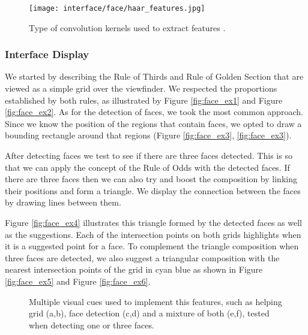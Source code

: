 \begin{figure}[htb]
	\centering
	\texttt{[image: interface/face/haar\_features.jpg]}
  	\caption{Type of convolution kernels used to extract features \cite{OCV}.}
	\label{fig:haar_features}
\end{figure}

\subsubsection{Interface Display}

We started by describing the Rule of Thirds and Rule of Golden Section that are viewed as a simple grid over the viewfinder. We respected the proportions established by both rules, as illustrated by Figure \ref{fig:face_ex1} and Figure \ref{fig:face_ex2}.
As for the detection of faces, we took the most common approach. Since we know the position of the regions that contain faces, we opted to draw a bounding rectangle around that regions (Figure \ref{fig:face_ex3}, \ref{fig:face_ex3}).

After detecting faces we test to see if there are three faces detected. This is so that we can apply the concept of the Rule of Odds with the detected faces. If there are three faces then we can also try and boost the composition by linking their positions and form a triangle. We display the connection between the faces by drawing lines between them.

Figure \ref{fig:face_ex4} illustrates this triangle formed by the detected faces as well as the suggestions. Each of the intersection points on both grids highlights when it is a suggested point for a face. To complement the triangle composition when three faces are detected, we also suggest a triangular composition with the nearest intersection points of the grid in cyan blue as shown in Figure \ref{fig:face_ex5} and Figure \ref{fig:face_ex6}.
\begin{figure}[htbp]
	\centering
  	\caption{Multiple visual cues used to implement this features, such as helping grid (a,b), face detection (c,d) and a mixture of both (e,f), tested when detecting one or three faces.}
	\label{fig:face_interface}
\end{figure}

